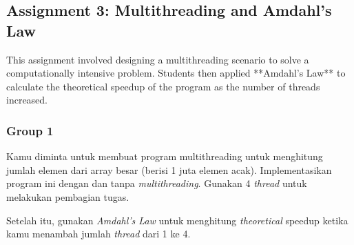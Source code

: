 \documentclass[12pt]{article}
\begin{document}
\subsection{Assignment 3: Multithreading and Amdahl's Law}
This assignment involved designing a multithreading scenario to solve a computationally intensive problem. Students then applied **Amdahl's Law** to calculate the theoretical speedup of the program as the number of threads increased.
\subsubsection{Group 1}
Kamu diminta untuk membuat program multithreading untuk menghitung jumlah elemen dari array besar (berisi 1 juta elemen acak). Implementasikan program ini dengan dan tanpa \textit{multithreading}. Gunakan 4 \textit{thread} untuk melakukan pembagian tugas.

Setelah itu, gunakan \textit{Amdahl's Law} untuk menghitung \textit{theoretical} speedup ketika kamu menambah jumlah \textit{thread} dari 1 ke 4.
\end{document}

